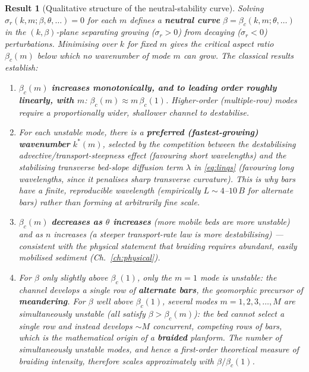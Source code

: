 \documentclass[11pt,a4paper]{report}
\theoremstyle{definition}
\theoremstyle{plain}
\newtheorem{result}{Result}[chapter]
\theoremstyle{remark}
\begin{document}
\begin{result}[Qualitative structure of the neutral-stability curve]
\label{res:neutral}
Solving $\sigma_r(k,m;\beta,\theta,\ldots)=0$ for each $m$ defines a \textbf{neutral curve} $\beta = \beta_c(k,m;\theta,\ldots)$ in the $(k,\beta)$-plane separating growing ($\sigma_r>0$) from decaying ($\sigma_r<0$) perturbations. Minimising over $k$ for fixed $m$ gives the critical aspect ratio $\beta_c(m)$ below which \emph{no} wavenumber of mode $m$ can grow. The classical results establish:
\begin{enumerate}[label=(\roman*), nosep]
\item $\beta_c(m)$ \textbf{increases monotonically, and to leading order roughly linearly, with $m$}: $\beta_c(m)\approx m\,\beta_c(1)$. Higher-order (multiple-row) modes require a proportionally wider, shallower channel to destabilise.
\item For each unstable mode, there is a \textbf{preferred (fastest-growing) wavenumber} $k^*(m)$, selected by the competition between the destabilising advective/transport-steepness effect (favouring short wavelengths) and the stabilising transverse bed-slope diffusion term $\lambda$ in \eqref{eq:linqs} (favouring long wavelengths, since it penalises sharp transverse curvature). This is why bars have a finite, reproducible wavelength (empirically $L\sim 4$--$10\,B$ for alternate bars) rather than forming at arbitrarily fine scale.
\item $\beta_c(m)$ \textbf{decreases as $\theta$ increases} (more mobile beds are more unstable) and as $n$ increases (a steeper transport-rate law is more destabilising) — consistent with the physical statement that braiding requires abundant, easily mobilised sediment (Ch.~\ref{ch:physical}).
\item For $\beta$ only slightly above $\beta_c(1)$, only the $m=1$ mode is unstable: the channel develops a single row of \textbf{alternate bars}, the geomorphic precursor of \textbf{meandering}. For $\beta$ well above $\beta_c(1)$, several modes $m=1,2,3,\dots,M$ are \emph{simultaneously} unstable (all satisfy $\beta>\beta_c(m)$): the bed cannot select a single row and instead develops $\sim M$ concurrent, competing rows of bars, which is the mathematical origin of a \textbf{braided} planform. The number of simultaneously unstable modes, and hence a first-order theoretical measure of braiding intensity, therefore scales approximately with $\beta/\beta_c(1)$.
\end{enumerate}
\end{result}
\end{document}
